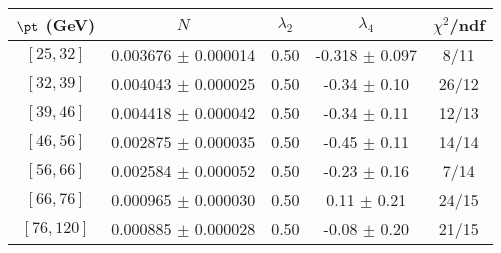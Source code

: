 \begin{tabular}{c||c|c|c|c}
$\pt$ (GeV) & $N$ & $\lambda_{2}$ & $\lambda_4$  & $\chi^2$/ndf  \\
\hline
$[25, 32]$ & 0.003676 $\pm$ 0.000014 & 0.50 & -0.318 $\pm$ 0.097 & 8/11\\
$[32, 39]$ & 0.004043 $\pm$ 0.000025 & 0.50 & -0.34 $\pm$ 0.10 & 26/12\\
$[39, 46]$ & 0.004418 $\pm$ 0.000042 & 0.50 & -0.34 $\pm$ 0.11 & 12/13\\
$[46, 56]$ & 0.002875 $\pm$ 0.000035 & 0.50 & -0.45 $\pm$ 0.11 & 14/14\\
$[56, 66]$ & 0.002584 $\pm$ 0.000052 & 0.50 & -0.23 $\pm$ 0.16 & 7/14\\
$[66, 76]$ & 0.000965 $\pm$ 0.000030 & 0.50 & 0.11 $\pm$ 0.21 & 24/15\\
$[76, 120]$ & 0.000885 $\pm$ 0.000028 & 0.50 & -0.08 $\pm$ 0.20 & 21/15\\
\end{tabular}
